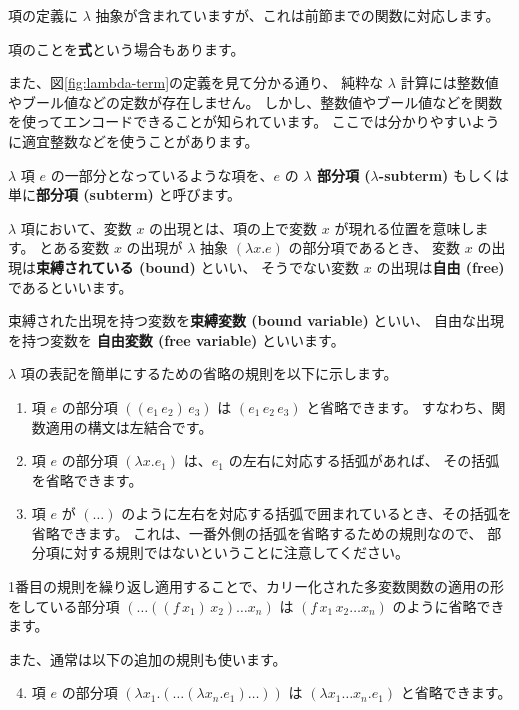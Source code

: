 項の定義に $\lambda$ 抽象が含まれていますが、これは前節までの関数に対応します。

項のことを\textbf{式}という場合もあります。

また、図\ref{fig:lambda-term}の定義を見て分かる通り、
純粋な $\lambda$ 計算には整数値やブール値などの定数が存在しません。
しかし、整数値やブール値などを関数を使ってエンコードできることが知られています。
ここでは分かりやすいように適宜整数などを使うことがあります。

$\lambda$ 項 $e$ の一部分となっているような項を、$e$ の
\textbf{$\lambda$ 部分項 ($\lambda$-subterm)} もしくは単に\textbf{部分項 (subterm)} と呼びます。

$\lambda$ 項において、変数 $x$ の出現とは、項の上で変数 $x$ が現れる位置を意味します。
とある変数 $x$ の出現が $\lambda$ 抽象 $(\lambda x . e)$ の部分項であるとき、
変数 $x$ の出現は\textbf{束縛されている (bound)} といい、
そうでない変数 $x$ の出現は\textbf{自由 (free)} であるといいます。

束縛された出現を持つ変数を\textbf{束縛変数 (bound variable)} といい、
自由な出現を持つ変数を \textbf{自由変数 (free variable)} といいます。

$\lambda$ 項の表記を簡単にするための省略の規則を以下に示します。

\begin{enumerate}
  \item 項 $e$ の部分項 $((e_1 \, e_2) \, e_3)$ は $(e_1 \, e_2 \, e_3)$ と省略できます。
        すなわち、関数適用の構文は左結合です。
  \item 項 $e$ の部分項 $(\lambda x . e_1)$ は、$e_1$ の左右に対応する括弧があれば、
        その括弧を省略できます。
  \item 項 $e$ が $(\dots)$ のように左右を対応する括弧で囲まれているとき、その括弧を省略できます。
        これは、一番外側の括弧を省略するための規則なので、
        部分項に対する規則ではないということに注意してください。
\end{enumerate}

1番目の規則を繰り返し適用することで、カリー化された多変数関数の適用の形をしている部分項
$(\dots((f \, x_1) \, x_2) \dots x_n)$ は $(f \, x_1 \, x_2 \dots x_n)$ のように省略できます。

また、通常は以下の追加の規則も使います。

\begin{enumerate}
  \setcounter{enumi}{3}
  \item 項 $e$ の部分項 $(\lambda x_1. (\dots (\lambda x_n . e_1) \dots))$ は
        $(\lambda x_1 \dots x_n . e_1)$ と省略できます。
\end{enumerate}

